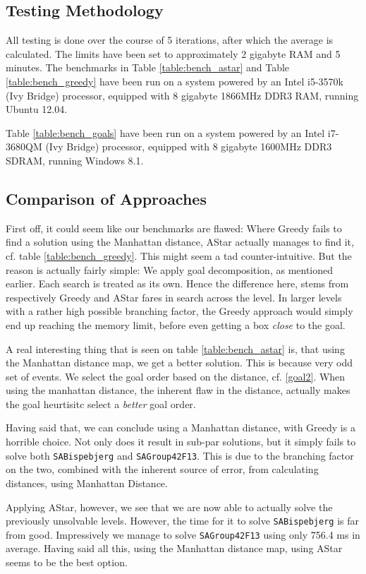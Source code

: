 \documentclass[letterpaper]{article}
\begin{document}
	\subsection{Testing Methodology}
		All testing is done over the course of 5 iterations, after which the average is calculated. The limits have been set to approximately 2 gigabyte RAM and 5 minutes. The benchmarks in Table \ref{table:bench_astar} and Table \ref{table:bench_greedy} have been run on a system powered by an Intel i5-3570k (Ivy Bridge) processor, equipped with 8 gigabyte 1866MHz DDR3 RAM, running Ubuntu 12.04.
		
		Table \ref{table:bench_goals} have been run on a system powered by an Intel i7-3680QM (Ivy Bridge) processor, equipped with 8 gigabyte 1600MHz DDR3 SDRAM, running Windows 8.1.

	\subsection{Comparison of Approaches}
		First off, it could seem like our benchmarks are flawed: Where Greedy fails to find a solution using the Manhattan distance, AStar actually manages to find it, cf. table \ref{table:bench_greedy}. This might seem a tad counter-intuitive. But the reason is actually fairly simple:  We apply goal decomposition, as mentioned earlier. Each search is treated as its own. Hence the difference here, stems from respectively Greedy and AStar fares in search across the level. In larger levels with a rather high possible branching factor, the Greedy approach would simply end up reaching the memory limit, before even getting a box \emph{close} to the goal.

		A real interesting thing that is seen on table \ref{table:bench_astar} is, that using the Manhattan distance map, we get a better solution. This is because very odd set of events. We select the goal order based on the distance, cf. \ref{goal2}. When using the manhattan distance, the inherent flaw in the distance, actually makes the goal heurtisitc select a \emph{better} goal order.

		Having said that, we can conclude using a Manhattan distance, with Greedy is a horrible choice. Not only does it result in sub-par solutions, but it simply fails to solve both \verb=SABispebjerg= and \verb=SAGroup42F13=. This is due to the branching factor on the two, combined with the inherent source of error, from calculating distances, using Manhattan Distance. 

		Applying AStar, however, we see that we are now able to actually solve the previously unsolvable levels. However, the time for it to solve \verb=SABispebjerg= is far from good. Impressively we manage to solve \verb=SAGroup42F13= using only 756.4 ms in average. Having said all this, using the Manhattan distance map, using AStar seems to be the best option.
\end{document}
